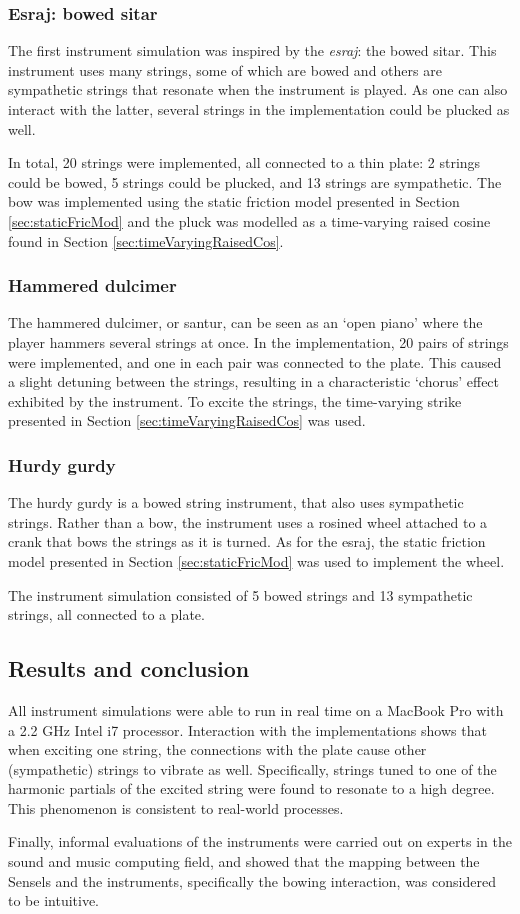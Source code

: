 \subsubsection{Esraj: bowed sitar}
The first instrument simulation was inspired by the \textit{esraj}: the bowed sitar. This instrument uses many strings, some of which are bowed and others are sympathetic strings that resonate when the instrument is played. As one can also interact with the latter, several strings in the implementation could be plucked as well. 

In total, 20 strings were implemented, all connected to a thin plate: 2 strings could be bowed, 5 strings could be plucked, and 13 strings are sympathetic. The bow was implemented using the static friction model presented in Section \ref{sec:staticFricMod} and the pluck was modelled as a time-varying raised cosine found in Section \ref{sec:timeVaryingRaisedCos}.

\subsubsection{Hammered dulcimer}
The hammered dulcimer, or santur, can be seen as an `open piano' where the player hammers several strings at once. In the implementation, 20 pairs of strings were implemented, and one in each pair was connected to the plate. This caused a slight detuning between the strings, resulting in a characteristic `chorus' effect exhibited by the instrument. To excite the strings, the time-varying strike presented in Section \ref{sec:timeVaryingRaisedCos} was used.

\subsubsection{Hurdy gurdy}
The hurdy gurdy is a bowed string instrument, that also uses sympathetic strings. Rather than a bow, the instrument uses a rosined wheel attached to a crank that bows the strings as it is turned. As for the esraj, the static friction model presented in Section \ref{sec:staticFricMod} was used to implement the wheel. 

The instrument simulation consisted of 5 bowed strings and 13 sympathetic strings, all connected to a plate. 

\subsection{Results and conclusion}
All instrument simulations were able to run in real time on a MacBook Pro with a 2.2 GHz Intel i7 processor.
Interaction with the implementations shows that when exciting one string, the connections with the plate cause other (sympathetic) strings to vibrate as well. Specifically, strings tuned to one of the harmonic partials of the excited string were found to resonate to a high degree. This phenomenon is consistent to real-world processes.

Finally, informal evaluations of the instruments were carried out on experts in the sound and music computing field, and showed that the mapping between the Sensels and the instruments, specifically the bowing interaction, was considered to be intuitive.